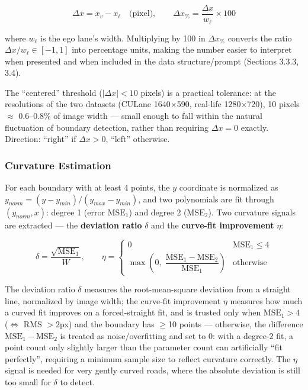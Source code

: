 \documentclass[12pt,a4paper]{report}
\begin{document}
\[
\Delta x = x_v - x_{\ell} \quad \text{(pixel)}, \qquad \Delta x_{\%} = \frac{\Delta x}{w_{\ell}} \times 100
\]

where $w_{\ell}$ is the ego lane's width. Multiplying by 100 in $\Delta x_\%$ converts the ratio $\Delta x/w_{\ell} \in [-1,1]$ into percentage units, making the number easier to interpret when presented and when included in the data structure/prompt (Sections 3.3.3, 3.4).

The ``centered'' threshold ($|\Delta x| < 10$ pixels) is a practical tolerance: at the resolutions of the two datasets (CULane 1640$\times$590, real-life 1280$\times$720), 10 pixels $\approx$ 0.6--0.8\% of image width --- small enough to fall within the natural fluctuation of boundary detection, rather than requiring $\Delta x = 0$ exactly. Direction: ``right'' if $\Delta x > 0$, ``left'' otherwise.

\subsubsection*{Curvature Estimation}

For each boundary with at least 4 points, the $y$ coordinate is normalized as $y_{norm} = (y - y_{min})/(y_{max} - y_{min})$, and two polynomials are fit through $(y_{norm}, x)$: degree 1 (error $\text{MSE}_1$) and degree 2 ($\text{MSE}_2$). Two curvature signals are extracted --- the \textbf{deviation ratio} $\delta$ and the \textbf{curve-fit improvement} $\eta$:

\[
\delta = \frac{\sqrt{\text{MSE}_1}}{W}, \qquad \eta = \begin{cases} 0 & \text{MSE}_1 \le 4 \\ \max\!\left(0,\; \dfrac{\text{MSE}_1 - \text{MSE}_2}{\text{MSE}_1}\right) & \text{otherwise} \end{cases}
\]

The deviation ratio $\delta$ measures the root-mean-square deviation from a straight line, normalized by image width; the curve-fit improvement $\eta$ measures how much a curved fit improves on a forced-straight fit, and is trusted only when $\text{MSE}_1 > 4$ ($\Leftrightarrow$ RMS $>2$px) and the boundary has $\ge$10 points --- otherwise, the difference $\text{MSE}_1-\text{MSE}_2$ is treated as noise/overfitting and set to 0: with a degree-2 fit, a point count only slightly larger than the parameter count can artificially ``fit perfectly'', requiring a minimum sample size to reflect curvature correctly. The $\eta$ signal is needed for very gently curved roads, where the absolute deviation is still too small for $\delta$ to detect.
\end{document}
